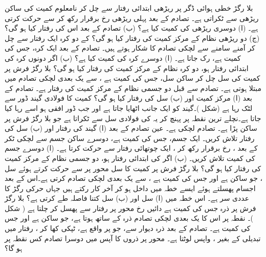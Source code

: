 بلا رگڑ   خطی ہوائی ڈگر  پر  ریڑھی   ابتدائی رفتار سے چل کر نامعلوم  کمیت  کی  ساکن ریڑھی  سے ٹکراتی ہے۔ تصادم کے بعد پہلی ریڑھی رخ برقرار رکھ کر  سے حرکت کرتی ہے۔ (ا) دوسری ریڑھی کی کمیت کیا ہے؟ (ب) تصادم کے بعد اس کی رفتار کیا ہو گی؟ (ج)  دو ریڑھی نظام کے مرکز کمیت کی رفتار کیا ہو گی؟
 کے دو کرہ  ایک رفتار سے چل کر آمنے سامنے سے لچکی تصادم کا شکار ہوتے ہیں۔ تصادم کے بعد ایک کرہ، جس کی کمیت  ہے، رک جاتا ہے۔ (ا) دوسرے کرہ کی کمیت کیا ہے؟ (ب)  اگر دونوں کرہ  کی ابتدائی رفتار  ہو، دو کرہ  نظام کے مرکز کمیت کی رفتار کیا ہو گی؟
بلا رگڑ فرش پر   کمیت کی سل چل کر   ساکن سل، جس کی کمیت  ہے ، سے  یک بعدی لچکی تصادم میں مبتلا ہوتی ہے۔ تصادم سے قبل دو جسمی نظام کے مرکز کمیت کی رفتار 
 ہے۔ تصادم کے بعد  (ا) مرکز کمیت اور (ب) سل  کی رفتار کیا ہو گی؟
 کمیت  کا فولادی گیند   ڈور  سے لٹک رہا ہے (شکل )۔گیند کو ایک جانب  اٹھایا جاتا ہے اور جب ڈور افقی ہو اسے رہا کیا جاتا ہے۔نچلے ترین نقطہ پر پہنچ کر یہ  کی فولادی سل سے ٹکراتا ہے جو بلا رگڑ فرش پر ساکن پڑا ہے۔ تصادم لچکی ہے۔ عین تصادم کے بعد (ا) گیند کی رفتار اور (ب)  سل کی رفتار تلاش کریں۔
ایک جسم،  جس کی کمیت  ہے،  دوسرے ساکن جسم سے لچکی ٹکر کے بعد ،  رخ برقرار رکھ کر ، ایک چوتھائی  رفتار سے  حرکت کرتا ہے۔ (ا) دوسرے جسم کی کمیت تلاش کریں۔ (ب)  اگر   کی ابتدائی رفتار  ہو، دو جسمی نظام کے مرکز کمیت کی رفتار کیا ہو گی؟
بلا رگڑ فرش پر  کمیت کا سل  محور  پر  سے حرکت کرتے ہوئے  سل  ، جو ساکن ہے اور جس کی کمیت  ہے ، سے یک بعدی لچکی تصادم کرتی ہے۔اس کے بعد اجسام پھسلتے ہوئے  ایسے خطہ میں داخل ہو کر آخر کار رکتے ہیں جہاں  حرکی رگڑ کا  عددی سر   ہے۔ اس خطہ میں (ا)  سل  اور (ب)  سل کتنا فاصلہ طے کرتی ہے؟
بلا رگڑ فرش پر  ذرہ  جس کی کمیت  ہے  دائیں رخ محور    پر    رفتار سے پھسل  کر چلتا ہے  ( شکل  )۔  نقطہ  پر اس کا یک بعدی لچکی تصادم ذرہ  کے ساتھ ہوتا ہے، جو ساکن ہے اور جس کی کمیت  ہے۔ تصادم کے بعد ذرہ   دیوار سے،  جو پر واقع ہے،   ٹپکی کھا کر  ، رفتار  میں تبدیلی کے بغیر ، واپس لوٹتا ہے۔ محور  پر ذروں کا  آپس میں دوسرا تصادم کس نقطہ پر ہو گا؟
